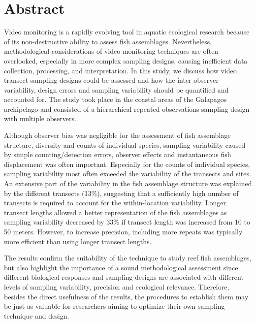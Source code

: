 \documentclass[10pt,letterpaper]{article}
\begin{document}
\section*{Abstract}
Video monitoring is a rapidly evolving tool in aquatic ecological research because of its non-destructive ability to assess fish assemblages. 
Nevertheless, methodological considerations of video monitoring techniques are often overlooked, especially in more complex sampling designs, causing inefficient data collection, 
processing, and interpretation. In this study, we discuss how video transect sampling designs could be assessed and how the inter-observer variability, design errors and sampling variability should be quantified and accounted for. The study took place in the coastal areas of the Galapagos archipelago and consisted of a  hierarchical repeated-observations sampling design with multiple observers. 

Although observer bias was negligible for the assessment of fish assemblage structure, diversity and counts of individual species, sampling variability caused by simple counting/detection errors, observer effects and instantaneous fish displacement was often important. Especially for the counts of individual species, sampling variability most often exceeded the variability of the transects and sites. An extensive part of the variability in the fish assemblage structure was explained by the different transects (13\%), suggesting that a sufficiently high number of transects is required to account for the within-location variability. Longer transect lengths allowed a better representation of the fish assemblages as sampling variability decreased by 33\% if transect length was increased from 10 to 50 meters. However, to increase precision, including more repeats was typically more efficient than using longer transect lengths. 

The results confirm the suitability of the technique to study reef fish assemblages, but also highlight the importance of a sound methodological assessment since different biological responses and sampling designs are associated with different levels of sampling variability, precision and ecological relevance. Therefore, besides the direct usefulness of the results, the procedures to establish them may be just as valuable for researchers aiming to optimize their own sampling technique and design.
\end{document}
